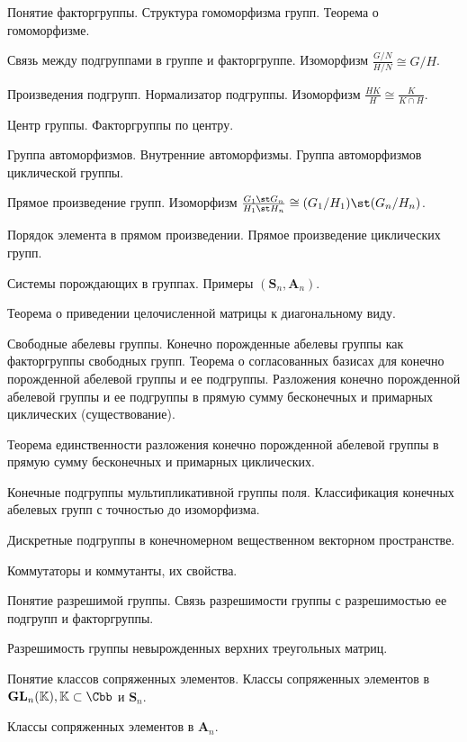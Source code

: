 \documentclass[a4paper]{article}
\begin{document}
\begin{nums}{-1}
\item
Понятие факторгруппы. Структура гомоморфизма групп. Теорема о
гомоморфизме.
\item
Связь между подгруппами в группе и факторгруппе. Изоморфизм
$\frac{G/N}{H/N}\cong G/H$.
\item
Произведения подгрупп. Нормализатор подгруппы. Изоморфизм
$\frac{HK}{H}\cong \frac{K}{K\cap H}$.
\item
Центр группы. Факторгруппы по центру.
\item
Группа автоморфизмов. Внутренние автоморфизмы. Группа
автоморфизмов циклической группы.
\item
Прямое произведение групп. Изоморфизм $\frac{G_1\st G_n}{H_1\st
H_n}\cong (G_1/H_1)\st (G_n/H_n)$.
\item
Порядок элемента в прямом произведении. Прямое произведение
циклических групп.
\item
Системы порождающих в группах. Примеры $(\mathbf{S}_n,
\mathbf{A}_n)$.
\item
Теорема о приведении целочисленной матрицы к диагональному виду.
\item
Свободные абелевы группы. Конечно порожденные абелевы группы как
факторгруппы свободных групп. Теорема о согласованных базисах для
конечно порожденной абелевой группы и ее подгруппы. Разложения
конечно порожденной абелевой группы и ее подгруппы в прямую сумму
бесконечных и примарных циклических (существование).
\item
Теорема единственности разложения конечно порожденной абелевой
группы в прямую сумму бесконечных и примарных циклических.
\item
Конечные подгруппы мультипликативной группы поля. Классификация
конечных абелевых групп с точностью до изоморфизма.
\item
Дискретные подгруппы в конечномерном вещественном векторном
пространстве.
\item
Коммутаторы и коммутанты, их свойства.
\item
Понятие разрешимой группы. Связь разрешимости группы с
разрешимостью ее подгрупп и факторгруппы.
\item
Разрешимость группы невырожденных верхних треугольных матриц.
\item
Понятие классов сопряженных элементов. Классы сопряженных
элементов в $\mathbf{GL}_n(\mathbb{K}), \mathbb{K}\subset\Cbb$ и
$\mathbf{S}_n$.
\item
Классы сопряженных элементов в $\mathbf{A}_n$.
\item

\end{nums}
\end{document}
